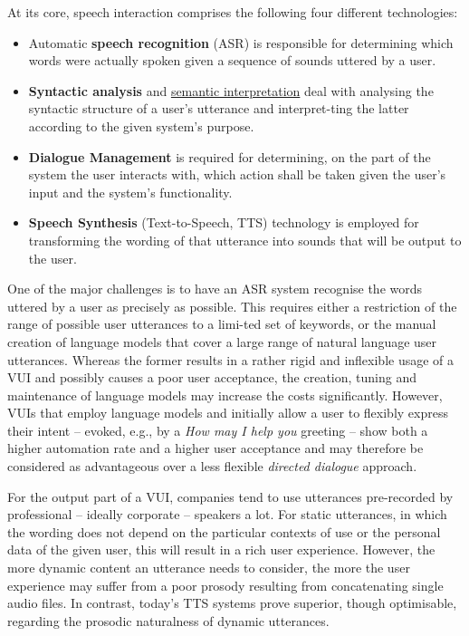 \begin{multicols}{2}
\begin{itemize}
\begin{multicols}{2}
At its core, speech interaction comprises the following four different technologies:
\begin{itemize}
\item Automatic \textbf{speech recognition} (ASR) is responsible for determining which words were actually spoken given a sequence of sounds uttered by a user.
\item \textbf{Syntactic analysis} and \underline{semantic interpretation} deal with analysing the syntactic structure of a user’s utterance and interpret-ting the latter according to the given system’s purpose.
\item \textbf{Dialogue Management} is required for determining, on the part of the system the user interacts with, which action shall be taken given the user’s input and the system’s functionality.
\item \textbf{Speech Synthesis} (Text-to-Speech, TTS) technology is employed for transforming the wording of that utterance into sounds that will be output to the user. 
\end{itemize}
One of the major challenges is to have an ASR system recognise the words uttered by a user as precisely as possible. This requires either a restriction of the range of possible user utterances to a limi-ted set of keywords, or the manual creation of language models that cover a large range of natural language user utterances. Whereas the former results in a rather rigid and inflexible usage of a VUI and possibly causes a poor user acceptance, the creation, tuning and maintenance of language models may increase the costs significantly. However, VUIs that employ language models and initially allow a user to flexibly express their intent – evoked, e.g., by a \textit{How may I help you} greeting – show both a higher automation rate and a higher user acceptance and may therefore be considered as advantageous over a less flexible \textit{directed dialogue} approach.


For the output part of a VUI, companies tend to use utterances pre-recorded by professional – ideally corporate – speakers a lot. For static utterances, in which the wording does not depend on the particular contexts of use or the personal data of the given user, this will result in a rich user experience. However, the more dynamic content an utterance needs to consider, the more the user experience may suffer from a poor prosody resulting from concatenating single audio files. In contrast, today’s TTS systems prove superior, though optimisable, regarding the prosodic naturalness of dynamic utterances.  


\end{multicols}
\end{itemize}
\end{multicols}
